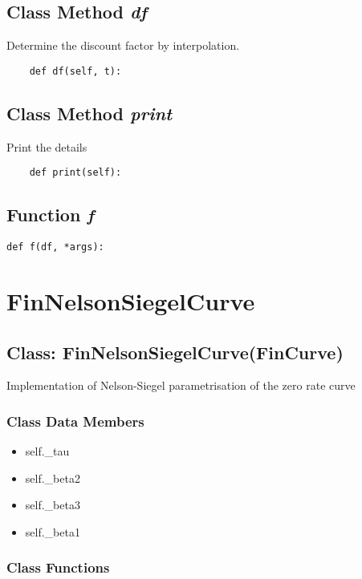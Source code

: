 \documentclass[twoside,11pt]{book}
\begin{document}
\subsection{Class Method {\it df}}
Determine the discount factor by interpolation. 

\begin{lstlisting}
    def df(self, t):
\end{lstlisting}

\subsection{Class Method {\it print}}
Print the details 

\begin{lstlisting}
    def print(self):
\end{lstlisting}

\subsection{Function {\it f}}


\begin{lstlisting}
def f(df, *args):
\end{lstlisting}

\newpage
\section{FinNelsonSiegelCurve}

\subsection{Class: FinNelsonSiegelCurve(FinCurve)}
Implementation of Nelson-Siegel parametrisation of the zero rate curve 

\subsubsection{Class Data Members}
\begin{itemize}
\item{self.\_tau}
\item{self.\_beta2}
\item{self.\_beta3}
\item{self.\_beta1}
\end{itemize}

\subsubsection{Class Functions}
\end{document}
